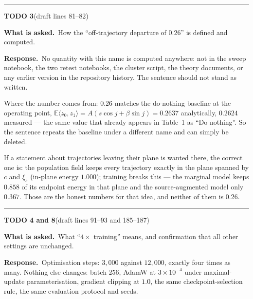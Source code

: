 \documentclass[11pt]{article}
\newenvironment{todoitem}[2]{%
  \par\medskip\noindent\rule{\textwidth}{0.7pt}\par\nobreak\smallskip
  \noindent\textbf{\large TODO #1}\quad\textnormal{\small(draft #2)}\par\nobreak\smallskip
}{\par\medskip}
\newcommand{\ask}[1]{\noindent\textbf{What is asked.}\ #1\par\smallskip}
\newcommand{\resp}[1]{\noindent\textbf{Response.}\ #1\par}
\begin{document}
\begin{todoitem}{3}{lines 81--82}
\ask{How the ``off-trajectory departure of $0.26$'' is defined and computed.}

\resp{No quantity with this name is computed anywhere: not in the sweep notebook, the two retest
notebooks, the cluster script, the theory documents, or any earlier version in the repository
history. The sentence should not stand as written.

Where the number comes from: $0.26$ matches the do-nothing baseline at the operating point,
$\mathbb E\langle z_0,z_1\rangle = A(s\cos j+\beta\sin j)=0.2637$ analytically, $0.2624$
measured --- the same value that already appears in Table~1 as ``Do nothing''. So the sentence
repeats the baseline under a different name and can simply be deleted.

If a statement about trajectories leaving their plane is wanted there, the correct one is: the
population field keeps every trajectory exactly in the plane spanned by $c$ and $\xi_s$
(in-plane energy $1.000$); training breaks this --- the marginal model keeps $0.858$ of its
endpoint energy in that plane and the source-augmented model only $0.367$. Those are the honest
numbers for that idea, and neither of them is $0.26$.}
\end{todoitem}

\begin{todoitem}{4 and 8}{lines 91--93 and 185--187}
\ask{What ``$4\times$ training'' means, and confirmation that all other settings are unchanged.}

\resp{Optimisation steps: $3{,}000$ against $12{,}000$, exactly four times as many. Nothing else
changes: batch $256$, AdamW at $3\times10^{-4}$ under maximal-update parameterisation, gradient
clipping at $1.0$, the same checkpoint-selection rule, the same evaluation protocol and seeds.}
\end{todoitem}
\end{document}
